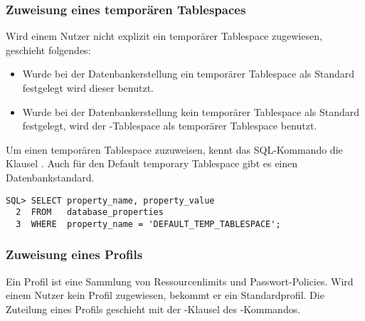         \subsubsection{Zuweisung eines tempor\"aren Tablespaces}
          Wird einem Nutzer nicht explizit ein tempor\"arer Tablespace zugewiesen, geschieht folgendes:
          \begin{itemize}
            \item Wurde bei der Datenbankerstellung ein tempor\"arer Tablespace als Standard festgelegt wird dieser benutzt.
            \item Wurde bei der Datenbankerstellung kein tempor\"arer Tablespace als Standard festgelegt, wird der -Tablespace als tempor\"arer Tablespace benutzt.
          \end{itemize}
          Um einen tempor\"aren Tablespace zuzuweisen, kennt das SQL-Kommando  die Klausel . Auch f\"ur den Default temporary Tablespace gibt es einen Datenbankstandard.
          \begin{lstlisting}[caption={Der Default Temporary
          Tablespace},label=admin202,language=oracle_sql]
SQL> SELECT property_name, property_value
  2  FROM   database_properties
  3  WHERE  property_name = 'DEFAULT_TEMP_TABLESPACE';
          \end{lstlisting}
        \subsubsection{Zuweisung eines Profils}
          Ein Profil ist eine Sammlung von Ressourcenlimits und Passwort-Policies. Wird einem Nutzer kein Profil zugewiesen, bekommt er ein Standardprofil. Die Zuteilung eines Profils geschieht mit der -Klausel des -Kommandos.

          \begin{literaturinternet}
            \item \cite{BABGIFFE}
          \end{literaturinternet}
